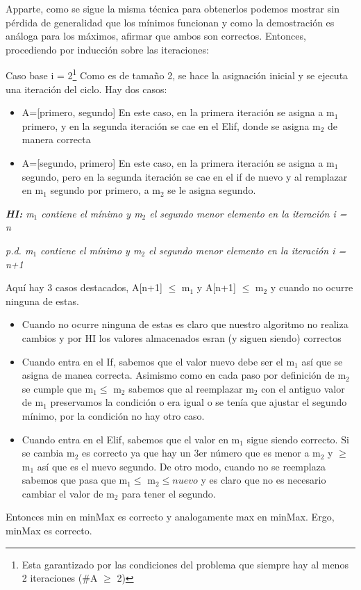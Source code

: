 \documentclass[a4paper, 12pt]{report}
\begin{document}
\begin{enumerate}
{\begin{enumerate}
{    Apparte, como se sigue la misma técnica para obtenerlos podemos
    mostrar sin pérdida de generalidad que los mínimos funcionan y 
    como la demostración es análoga para los máximos, afirmar que 
    ambos son correctos.
    Entonces, procediendo por inducción sobre las iteraciones:
    
    Caso base i = 2\footnote{Esta garantizado por las condiciones del
    problema que siempre hay al menos 2 iteraciones (\#A $\geq$ 2)}
    Como es de tamaño 2, se hace la asignación inicial y se ejecuta
    una iteración del ciclo. Hay dos casos:
    \begin{itemize}
        \item A=[primero, segundo]
        En este caso, en la primera iteración se asigna a m$_1$ primero,
        y en la segunda iteración se cae en el Elif, donde se asigna
        m$_2$ de manera correcta
        
        \item A=[segundo, primero]
        En este caso, en la primera iteración se asigna a m$_1$ segundo,
        pero en la segunda iteración se cae en el if de nuevo y al
        remplazar en m$_1$ segundo por primero, a m$_2$ se le asigna
        segundo.
    \end{itemize}
    
    \textit{\textbf{HI:} m$_1$ contiene el mínimo y m$_2$ el segundo
    menor elemento en la iteración i = n}
    
    \textit{p.d. m$_1$ contiene el mínimo y m$_2$ el segundo menor elemento en la iteración i = n+1}
    {Aquí hay 3 casos destacados, A[n+1] $\leq$ m$_1$ y A[n+1] $\leq$
    m$_2$ y cuando no ocurre ninguna de estas. 
    \begin{itemize}
        \item Cuando no ocurre ninguna de estas es claro que
        nuestro algoritmo no realiza cambios y por HI los valores
        almacenados esran (y siguen siendo) correctos
        
        \item Cuando entra en el If, sabemos que el valor nuevo debe
        ser el m$_1$ así que se asigna de manea correcta.
        Asimismo como en cada paso por definición de m$_2$ se cumple
        que m$_1 \leq$ m$_2$ sabemos que al reemplazar m$_2$ con el
        antiguo valor de m$_1$ preservamos la condición o era igual o
        se tenía que ajustar el segundo mínimo, por la condición no hay
        otro caso.
        
        \item Cuando entra en el Elif, sabemos que el valor en m$_1$
        sigue siendo correcto. Si se cambia m$_2$ es correcto ya que hay
        un 3er número que es menor a m$_2$ y $\geq$ m$_1$ así que es el
        nuevo segundo. De otro modo, cuando no se reemplaza sabemos que
        pasa que m$_1 \leq$ m$_2 \leq nuevo$ y es claro que
        no es necesario cambiar el valor de m$_2$ para tener el segundo.
    \end{itemize}
    Entonces min en minMax es correcto y analogamente max en minMax.
    Ergo, minMax es correcto.
    
}}
\end{enumerate}}
\end{enumerate}
\end{document}
